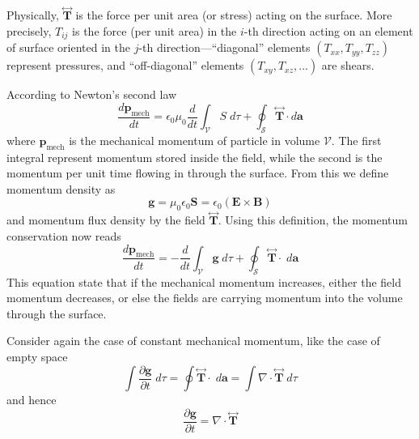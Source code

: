 \documentclass[../../../main.tex]{subfiles}
\begin{document}
Physically, $\stackrel{\leftrightarrow}{\mathbf{T}}$ is the force per unit area (or stress) acting on the surface.
More precisely, $T_{ij}$ is the force (per unit area) in the $i$-th direction acting on an element of surface oriented in the $j$-th direction—“diagonal” elements $(T_{xx},T_{yy},T_{zz})$ represent pressures, and “off-diagonal” elements $(T_{xy} , T_{xz} ,\dots)$ are shears.

According to Newton's second law
\begin{equation*}
    \frac{d\mathbf{p}_\text{mech}}{dt}=\epsilon_0\mu_0\frac{d}{dt}\int_\mathcal{V}S\;d\tau+\oint_\mathcal{S}\stackrel{\leftrightarrow}{\mathbf{T}}\cdot d\mathbf{a}
\end{equation*}
where $\mathbf{p}_\text{mech}$ is the mechanical momentum of particle in volume $\mathcal{V}$.
The first integral represent momentum stored inside the field, while the second is the momentum per unit time ﬂowing in through the surface.
From this we define momentum density as
\begin{equation*}
    \mathbf{g}=\mu_0\epsilon_0\mathbf{S}=\epsilon_0(\mathbf{E}\times\mathbf{B})
\end{equation*}
and momentum flux density by the field $\stackrel{\leftrightarrow}{\mathbf{T}}$.
Using this definition, the momentum conservation now reads
\begin{equation*}
    \frac{d\mathbf{p}_\text{mech}}{dt}=-\frac{d}{dt}\int_\mathcal{V}\mathbf{g}\;d\tau+\oint_\mathcal{S}\stackrel{\leftrightarrow}{\mathbf{T}}\cdot \;d\mathbf{a}
\end{equation*}
This equation state that if the mechanical momentum increases, either the ﬁeld momentum decreases, or else the ﬁelds are carrying momentum into the volume through the surface.

Consider again the case of constant mechanical momentum, like the case of empty space
\begin{equation*}
    \int \frac{\partial\mathbf{g}}{\partial t}\;d\tau=\oint\stackrel{\leftrightarrow}{\mathbf{T}} \cdot \;d\mathbf{a}= \int\nabla\cdot\stackrel{\leftrightarrow}{\mathbf{T}}\;d\tau
\end{equation*}
and hence 
\begin{equation*}
    \frac{\partial \mathbf{g}}{\partial t}=\nabla\cdot\stackrel{\leftrightarrow}{\mathbf{T}}
\end{equation*}
\end{document}
